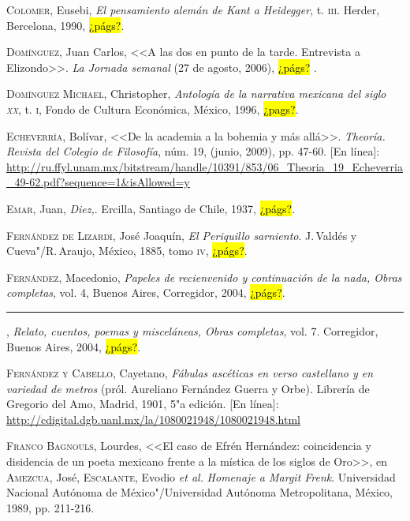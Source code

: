 \documentclass[14pt,twoside,final]{extbook} %
\begin{document}
\textsc{Colomer}, Eusebi, \emph{El pensamiento alemán de Kant a Heidegger}, t. \textsc{iii}. Herder, Bercelona, 1990, \hl{¿págs?}.\label{bib:colomer1990}

\textsc{Domínguez}, Juan Carlos, <<A las dos en punto de la tarde. Entrevista a Elizondo>>. \emph{La Jornada semanal} (27 de agosto, 2006), \hl{¿págs?} .\label{bib:dominguez2006}

\textsc{Domínguez Michael}, Christopher, \emph{Antología de la narrativa mexicana del siglo \textsc{xx}}, t. \textsc{i}, Fondo de Cultura Económica, México, 1996, \hl{¿pags?}.\label{bib:dominguez1996}

\textsc{Echeverría}, Bolívar, <<De la academia a la bohemia y más allá>>. \emph{Theoría. Revista del Colegio de Filosofía}, núm. 19, (junio, 2009), pp. 47-60. [En línea]: \url{http://ru.ffyl.unam.mx/bitstream/handle/10391/853/06_Theoria_19_Echeverria_49-62.pdf?sequence=1&isAllowed=y}\label{bib:echeverria2009}

\textsc{Emar}, Juan, \emph{Diez,}. Ercilla, Santiago de Chile, 1937, \hl{¿págs?}.\label{bib:emar1937}

\textsc{Fernández de Lizardi}, José Joaquín, \emph{El Periquillo sarniento}. J.\,Valdés y Cueva"/R.\,Araujo, México, 1885, tomo \textsc{iv}, \hl{¿págs?}.\label{bib:fernandezlizardi1885}

\textsc{Fernández}, Macedonio, \emph{Papeles de recienvenido y continuación de la nada, Obras completas}, vol. 4, Buenos Aires, Corregidor, 2004, \hl{¿págs?}.\label{bib:fernandez2004a}

\rule{1cm}{0.4pt}, \emph{Relato, cuentos, poemas y misceláneas, Obras completas}, vol. 7. Corregidor, Buenos Aires, 2004, \hl{¿págs?}.\label{bib:fernandez2004b}

\textsc{Fernández y Cabello}, Cayetano, \emph{Fábulas ascéticas en verso castellano y en variedad de metros} (pról. Aureliano Fernández Guerra y Orbe). Librería de Gregorio del Amo, Madrid, 1901, 5"a edición. [En línea]: \url{http://cdigital.dgb.uanl.mx/la/1080021948/1080021948.html}

\textsc{Franco Bagnouls}, Lourdes, <<El caso de Efrén Hernández: coincidencia y disidencia de un poeta mexicano frente a la mística de los siglos de Oro>>, en \textsc{Amezcua}, José, \textsc{Escalante}, Evodio \emph{et al.} \emph{Homenaje a Margit Frenk}. Universidad Nacional Autónoma de México"/Universidad Autónoma Metropolitana, México, 1989, pp. 211-216.\label{bib:franco1989}
\end{document}
